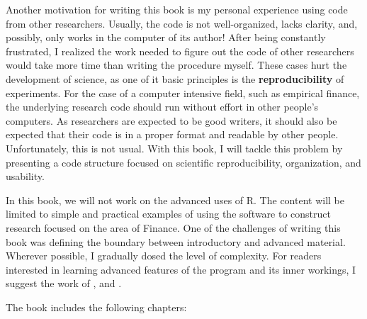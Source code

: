 \documentclass[11pt,]{book}
\begin{document}
Another motivation for writing this book is my personal experience using
code from other researchers. Usually, the code is not well-organized,
lacks clarity, and, possibly, only works in the computer of its author!
After being constantly frustrated, I realized the work needed to figure
out the code of other researchers would take more time than writing the
procedure myself. These cases hurt the development of science, as one of
it basic principles is the \textbf{reproducibility} of experiments. For
the case of a computer intensive field, such as empirical finance, the
underlying research code should run without effort in other people's
computers. As researchers are expected to be good writers, it should
also be expected that their code is in a proper format and readable by
other people. Unfortunately, this is not usual. With this book, I will
tackle this problem by presenting a code structure focused on scientific
reproducibility, organization, and usability.

In this book, we will not work on the advanced uses of R. The content
will be limited to simple and practical examples of using the software
to construct research focused on the area of Finance. One of the
challenges of writing this book was defining the boundary between
introductory and advanced material. Wherever possible, I gradually dosed
the level of complexity. For readers interested in learning advanced
features of the program and its inner workings, I suggest the work of
\citet{venables2004introduction}, \citet{teetor2011r} and
\citet{wickham2014advanced}.

The book includes the following chapters:
\end{document}
